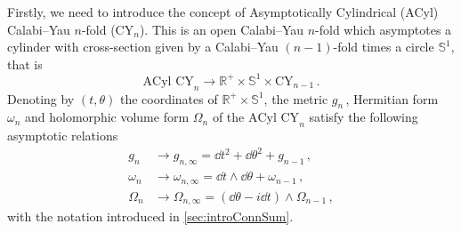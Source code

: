 \documentclass{pspum-l}
\newcommand*\Sc{\mathbb{S}}
\newcommand*\R{\mathbb{R}}
\theoremstyle{definition}
\theoremstyle{remark}
\numberwithin{equation}{section}
\begin{document}
Firstly, we need to introduce the concept of Asymptotically Cylindrical (ACyl) Calabi--Yau $n$-fold (CY$_n$). This is an open Calabi--Yau $n$-fold which asymptotes a cylinder with cross-section given by a Calabi--Yau $(n-1)$-fold times a circle $\Sc^1$, that is
\begin{equation}
    \text{ACyl CY}_n\longrightarrow\R^+\times \Sc^1\times\text{CY}_{n-1} \, .
\end{equation}
Denoting by $(t,\theta)$ the coordinates of $\R^+\times \Sc^1$, the metric $g_n\,$, Hermitian form $\omega_n$ and holomorphic volume form $\Omega_n$ of the $\text{ACyl CY}_n$ satisfy the following asymptotic relations
\begin{align}
\label{eq:metricCYasymptotic}
    g_n & \longrightarrow g_{n,\infty}=\dd t^2+\dd\theta^2+g_{n-1} \, ,\\
    \label{eq:hermitianasymptotic}
    \omega_n & \longrightarrow \omega_{n,\infty}=\dd t\wedge\dd\theta + \omega_{n-1} \, ,\\
    \label{eq:holomorphicasymptotic}
    \Omega_n & \longrightarrow \Omega_{n,\infty}=(\dd\theta-i\dd t)\wedge\Omega_{n-1} \, ,
\end{align}
with the notation introduced in \cref{sec:introConnSum}.
\end{document}
